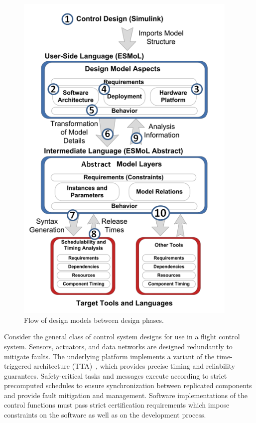 \begin{figure}
\centering
\includegraphics[width=4.2in]{figures/designflow.png}
    \caption{Flow of design models between design phases. }
    \label{fig:designflow}
\end{figure}

Consider the general class of control system designs for use in a flight control system.  Sensors, 
actuators, and data networks are designed redundantly to mitigate faults.  The underlying platform 
implements a variant of the time-triggered architecture (TTA)~\cite{timed:tta}, which provides 
precise timing and reliability guarantees.  Safety-critical tasks and messages execute according to 
strict precomputed schedules to ensure synchronization between replicated components and provide fault 
mitigation and management.  Software implementations of the control functions must pass strict 
certification requirements which impose constraints on the software as well as on the development 
process.  

